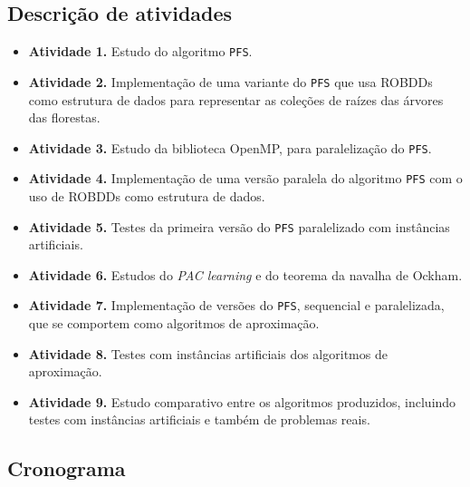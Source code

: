 \documentclass[12pt]{article}
\begin{document}
\subsection{Descrição de atividades} \label{sec:atividades}
\begin{itemize}
    \item{\bf Atividade 1.}
        Estudo do algoritmo {\tt PFS}.
    \item{\bf Atividade 2.}
        Implementação de uma variante do {\tt PFS} que usa ROBDDs como 
        estrutura de dados para representar as coleções de raízes das árvores das florestas.
    \item{\bf Atividade 3.}
        Estudo da biblioteca OpenMP, para paralelização do {\tt PFS}.
    \item{\bf Atividade 4.}
        Implementação de uma versão paralela do algoritmo {\tt PFS} com
        o uso de ROBDDs como estrutura de dados.
    \item{\bf Atividade 5.}
        Testes da primeira versão do {\tt PFS} paralelizado com instâncias
        artificiais.
    \item{\bf Atividade 6.}
        Estudos do {\em PAC learning} e do teorema da navalha de Ockham.
    \item{\bf Atividade 7.} 
        Implementação de versões do {\tt PFS}, sequencial e paralelizada, que se 
        comportem como algoritmos de aproximação.
    \item{\bf Atividade 8.}
        Testes com instâncias artificiais dos algoritmos de aproximação.
    \item{\bf Atividade 9.}
        Estudo comparativo entre os algoritmos produzidos, incluindo testes com instâncias artificiais e também de problemas reais.
\end{itemize}

\subsection{Cronograma}
\end{document}
